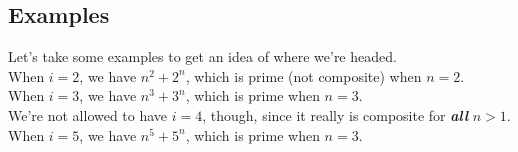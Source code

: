 \documentclass{paper}
\begin{document}
\subsection{Examples}
Let's take some examples to get an idea of where we're headed. \\

When $i=2$, we have $n^2 + 2^n$, which is prime (not composite) when $n=2$. \\

When $i=3$, we have $n^3 + 3^n$, which is prime when $n=3$.\\

We're not allowed to have $i=4$, though, since it really is composite for \textbf{\textit{all}} $n>1$. \\

When $i=5$, we have $n^5 + 5^n$, which is prime when $n=3$. 
\end{document}
